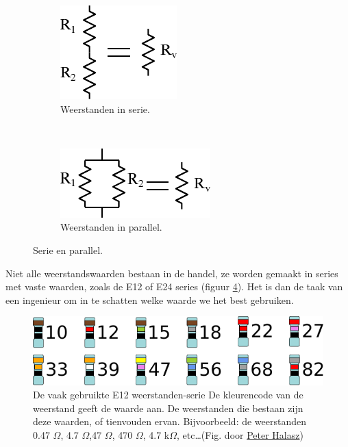 \documentclass{article}
\begin{document}
			\begin{figure}[hbtp]
				\centering
				\begin{subfigure}[b]{0.3\linewidth}
					\centering
					\includegraphics{serie}
					\caption{Weerstanden in serie.}
					\label{subfig:serie}
				\end{subfigure}
				~
				\begin{subfigure}[b]{0.3\linewidth}
					\centering
					\includegraphics{parallel}
					\caption{Weerstanden in parallel.}
					\label{subfig:parallel}
				\end{subfigure}
				\caption{Serie en parallel.}
				\label{fig:serie_en_parallel}
			\end{figure}

			Niet alle weerstandswaarden bestaan in de handel, ze worden gemaakt in series met vaste waarden, zoals de E12 of E24 series (figuur \ref{fig:e12}). Het is dan de taak van een ingenieur om in te schatten welke waarde we het best gebruiken. 

			\begin{figure}[htbp]
				\centering
				\includegraphics[scale=0.8]{e12}
				\caption{
				De vaak gebruikte E12 weerstanden-serie
				De kleurencode van de weerstand geeft de waarde aan. De weerstanden die bestaan zijn deze waarden, of tienvouden ervan. Bijvoorbeeld: de weerstanden 0.47 $\Omega$,  4.7 $\Omega$,47 $\Omega$, 470 $\Omega$, 4.7 k$\Omega$, etc\ldots (Fig. door \href{https://en.wikipedia.org/wiki/User:Pengo}{Peter Halasz})
				} 
				\label{fig:e12}
			\end{figure}
\end{document}
